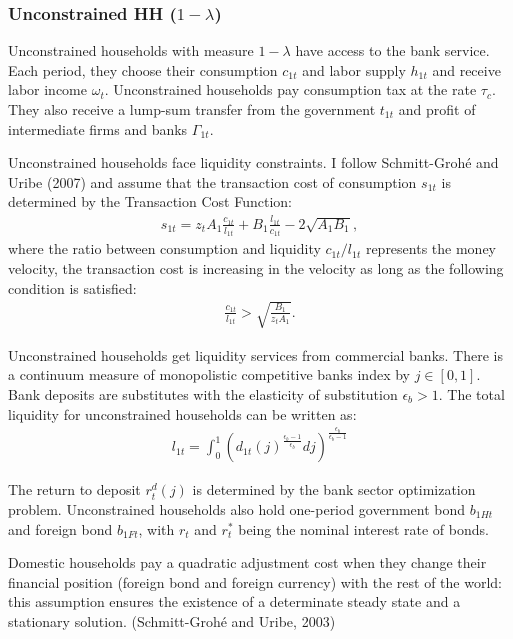 \documentclass[12pt]{article}
\begin{document}
\subsubsection*{Unconstrained HH ($1-\lambda$)} 
Unconstrained households with measure $1-\lambda$ have access to the bank service. Each period, they choose their consumption $c_{1t}$ and labor supply $h_{1t}$ and receive labor income $\omega_t$. Unconstrained households pay consumption tax at the rate $\tau_c$. They also receive a lump-sum transfer from the government $t_{1t}$ and profit of intermediate firms and banks $\Gamma_{1t}$.

Unconstrained households face liquidity constraints. I follow Schmitt-Groh{\'e} and Uribe (2007) and assume that the transaction cost of consumption $s_{1t}$ is determined by the Transaction Cost Function:
\begin{align*}
s_{1t} = z_tA_1\frac{c_{1t}}{l_{1t}}+B_1\frac{l_{1t}}{c_{1t}}-2\sqrt{A_1B_1},
\end{align*}
where the ratio between consumption and liquidity $c_{1t}/l_{1t}$ represents the money velocity, the transaction cost is increasing in the velocity as long as the following condition is satisfied:  
\begin{align*}
\frac{c_{1t}}{l_{1t}}>\sqrt{\frac{B_1}{z_tA_1}}.
\end{align*} 

Unconstrained households get liquidity services from commercial banks. There is a continuum measure of monopolistic competitive banks index by $j \in [0,1]$. Bank deposits are substitutes with the elasticity of substitution $\epsilon_b > 1$. The total liquidity for unconstrained households can be written as: 
\begin{align}
\label{l1t}
l_{1t} = \int_0^1({d_{1t}(j)}^{\frac{\epsilon_b-1}{\epsilon_b}}dj)^{\frac{\epsilon_b}{\epsilon_b-1}} 
\end{align}

The return to deposit $r_t^d(j)$ is determined by the bank sector optimization problem. Unconstrained households also hold one-period government bond $b_{1Ht}$ and foreign bond $b_{1Ft}$, with $r_t$ and $r_t^*$ being the nominal interest rate of bonds. 

Domestic households pay a quadratic adjustment cost when they change their financial position (foreign bond and foreign currency) with the rest of the world: this assumption ensures the existence of a determinate steady state and a stationary solution. (Schmitt-Groh{\'e} and Uribe, 2003)
\end{document}
